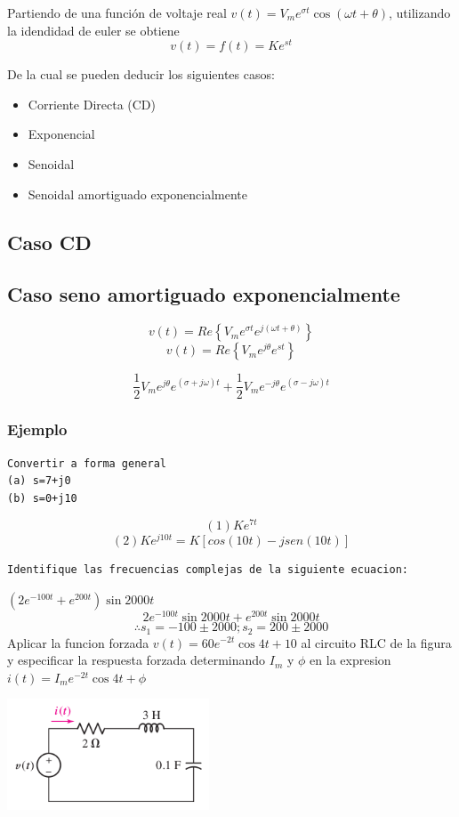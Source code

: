 \documentclass[11pt]{article}
\begin{document}
Partiendo de una función de voltaje real \(v(t)=V_m e^{\sigma t} \cos{(\omega t+\theta)}\),
utilizando la idendidad de euler se obtiene
$$v(t)=f(t)=Ke^{st}$$

De la cual se pueden deducir los siguientes casos:
\begin{itemize}
\item Corriente Directa (CD)
\item Exponencial
\item Senoidal
\item Senoidal amortiguado exponencialmente
\end{itemize}

\subsection{Caso CD}
\label{sec:orgheadline12}

\subsection{Caso seno amortiguado exponencialmente}
\label{sec:orgheadline14}
$$v(t)=Re \left\{V_m e^{\sigma t} e^{j (\omega t +\theta)}  \right\}$$
$$v(t)=Re \left\{V_m e^{j\theta} e^{st}  \right\}$$


$$\frac{1}{2} V_m e^{j\theta} e^{(\sigma + j\omega)t} + \frac{1}{2} V_m e^{-j\theta} e^{(\sigma - j\omega)t}$$
\subsubsection{Ejemplo}
\label{sec:orgheadline13}
\begin{verbatim}
Convertir a forma general
(a) s=7+j0
(b) s=0+j10
\end{verbatim}
$$(1)Ke^{7t}$$
$$(2)Ke^{j10t}=K \left[ cos(10t)-jsen(10t) \right] $$

\begin{verbatim}
Identifique las frecuencias complejas de la siguiente ecuacion:
\end{verbatim}
\((2 e^{-100t}+ e^{200t}) \sin{2000t}\)
$$2 e^{-100t} \sin{2000t} +e^{200t}\sin{2000t} $$
$$\therefore s_1=-100\pm 2000;s_2=200\pm 2000$$
Aplicar la funcion forzada \(v(t)=60 e^{-2t} \cos{4t+10}\) al
circuito RLC de la figura y especificar la respuesta forzada
determinando \(I_m\) y \(\phi\) en la expresion \(i(t)=I_m e^{-2t} \cos{4t+\phi}\)

\includegraphics[width=6cm]{data/3d/2b2155-c4a3-4377-9dc1-c7656ef5dd8c/screenshot-20151013-181600.png}
\end{document}
